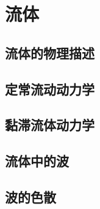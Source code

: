 \chapter{流体}



\section{流体的物理描述}

\section{定常流动动力学}

\section{黏滞流体动力学}

\section{流体中的波}

\section{波的色散}